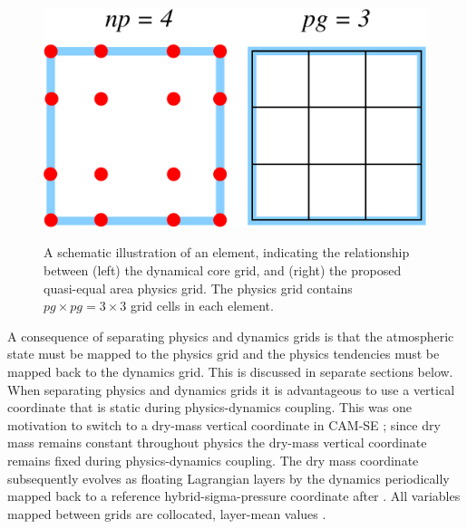 \documentclass[twocol]{ametsoc}
\begin{document}
\begin{figure}[t]
\begin{center}
\noindent\includegraphics[width=37pc,angle=0]{figs/np4_pg3.pdf}\\
\end{center}
\caption{A schematic illustration of an element, indicating the relationship between (left) the dynamical core grid, and (right) the proposed quasi-equal area physics grid. The physics grid contains $pg\times pg=3\times 3$ grid cells in each element.}
\label{fig:np4_pg3}
\end{figure}

A consequence of separating physics and dynamics grids is that the atmospheric state must be mapped to the physics grid and the physics tendencies must be mapped back to the dynamics grid. This is discussed in separate sections below. When separating physics and dynamics grids it is advantageous to use a vertical coordinate that is static during physics-dynamics coupling. This was one motivation to switch to a dry-mass vertical coordinate in CAM-SE \citep{LetAl2018JAMES}; since dry mass remains constant throughout physics the dry-mass vertical coordinate remains fixed during physics-dynamics coupling. {\color{red}The dry mass coordinate subsequently evolves as floating Lagrangian layers by the dynamics \citep{L2004MWR} periodically mapped back to a reference hybrid-sigma-pressure coordinate after \cite{SB1981MWR}. All variables mapped between grids are collocated, layer-mean values \citep{LetAl2018JAMES}.{}}
 
\end{document}
